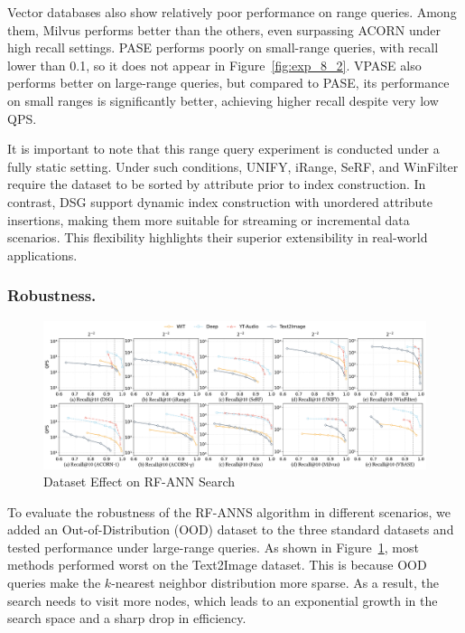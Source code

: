 \documentclass[sigconf, nonacm]{acmart}
\begin{document}
	Vector databases also show relatively poor performance on range queries. Among them, Milvus performs better than the others, even surpassing ACORN under high recall settings. PASE performs poorly on small-range queries, with recall lower than 0.1, so it does not appear in Figure~\ref{fig:exp_8_2}. VPASE also performs better on large-range queries, but compared to PASE, its performance on small ranges is significantly better, achieving higher recall despite very low QPS.

	
	
	
	It is important to note that this range query experiment is conducted under a fully static setting. Under such conditions, UNIFY, iRange, SeRF, and WinFilter require the dataset to be sorted by attribute prior to index construction. In contrast, DSG  support dynamic index construction with unordered attribute insertions, making them more suitable for streaming or incremental data scenarios. This flexibility highlights their superior extensibility in real-world applications.
	\subsubsection{Robustness.}
	
	\begin{figure}[htbp]
		\centering
		\includegraphics[width=\textwidth]{figures/exp/exp_8_3.pdf}
		\caption{Dataset Effect on RF-ANN Search}
		\label{fig:exp_8_3}
	\end{figure}
	
To evaluate the robustness of the RF-ANNS algorithm in different scenarios, we added an Out-of-Distribution (OOD) dataset to the three standard datasets and tested performance under large-range queries. As shown in Figure~\ref{fig:exp_8_3}, most methods performed worst on the Text2Image dataset. This is because OOD queries make the $k$-nearest neighbor distribution more sparse. As a result, the search needs to visit more nodes, which leads to an exponential growth in the search space and a sharp drop in efficiency.
\end{document}
